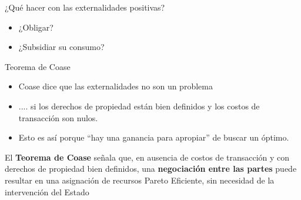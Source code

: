 \documentclass{beamer}
\begin{document}
\begin{frame}{¿Qué hacer con las externalidades positivas?}
    \begin{itemize}
        \item ¿Obligar?
        \vspace{1mm}
        \item ¿Subsidiar su consumo?
    \end{itemize}
\end{frame}


\begin{frame}{Teorema de Coase}
    \begin{itemize}
        \item Coase dice que las externalidades no son un problema
        \item .... si los derechos de propiedad están bien definidos y los costos de transacción son nulos.
        \item Esto es así porque ``hay una ganancia para apropiar'' de buscar un óptimo.
    \end{itemize}
        \begin{boxB}
        \centering
        El \textbf{Teorema de Coase} señala que, en ausencia de costos de transacción y con derechos de propiedad bien definidos, una \textbf{negociación entre las partes }puede resultar en una asignación de recursos Pareto Eficiente, sin necesidad de la intervención del Estado
        \end{boxB}
\end{frame}
\end{document}
